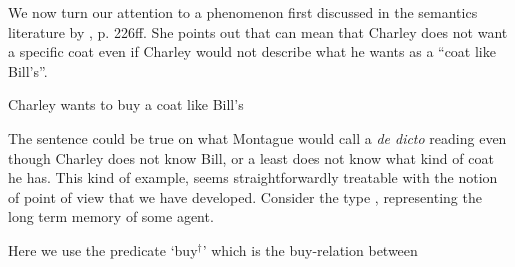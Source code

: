 We now turn our attention to a phenomenon first discussed in the
semantics literature by \cite{Fodor1970}, p. 226ff.  She points out
that \nexteg{} can mean that Charley does not want a specific coat
even if Charley would not describe what he wants as a ``coat like
Bill's''.  
\begin{ex} 
Charley wants to buy a coat like Bill's 
\end{ex}   
The sentence could be true on what Montague would call a
\textit{de dicto} reading even though Charley does not know Bill, or a
least does not know what kind of coat he has.  This kind of example,
seems straightforwardly treatable with the notion of point of view
that we have developed.  Consider the type \nexteg{}, representing the
long term memory of some agent.
\newsavebox{\desires}
\newsavebox{\despov}
\begin{ex} 
\end{ex} 
Here we use the predicate `buy$^\dagger$' which is the buy-relation between
